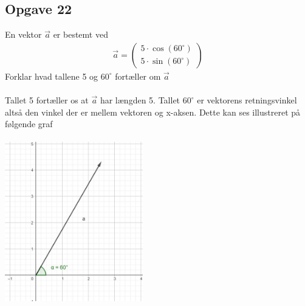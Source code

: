 \subsection{Opgave 22}

En vektor $\Vec{a}$ er bestemt ved
\begin{align*}
    \Vec{a} = \begin{pmatrix}5\cdot \cos(60^{\circ}) \\ 5\cdot \sin(60^{\circ})\end{pmatrix}
\end{align*}
Forklar hvad tallene 5 og $60^{\circ}$ fortæller om $\Vec{a}$\\\\

\ans
Tallet 5 fortæller os at $\Vec{a}$ har længden 5. Tallet $60^{\circ}$ er vektorens retningsvinkel altså den vinkel der er mellem vektoren og x-aksen. Dette kan ses illustreret på følgende graf\\\\
\includegraphics[width = 6cm]{Opgave_21-30/Opgave_22/22.jpg}